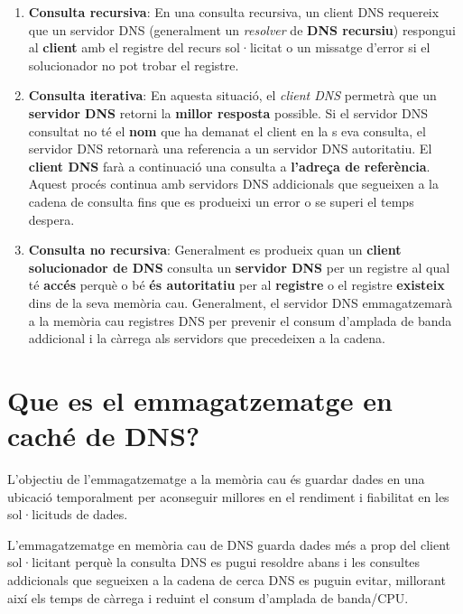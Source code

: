 \documentclass[]{article}
\begin{document}
\begin{enumerate}
\def\labelenumi{\arabic{enumi}.}
\item
  \textbf{Consulta recursiva}: En una consulta recursiva, un client DNS
  requereix que un servidor DNS (generalment un \emph{resolver} de
  \textbf{DNS recursiu}) respongui al \textbf{client} amb el registre
  del recurs sol·licitat o un missatge d'error si el solucionador no pot
  trobar el registre.
\item
  \textbf{Consulta iterativa}: En aquesta situació, el \emph{client DNS}
  permetrà que un \textbf{servidor DNS} retorni la \textbf{millor
  resposta} possible. Si el servidor DNS consultat no té el \textbf{nom}
  que ha demanat el client en la s eva consulta, el servidor DNS
  retornarà una referencia a un servidor DNS autoritatiu. El
  \textbf{client DNS} farà a continuació una consulta a \textbf{l'adreça
  de referència}. Aquest procés continua amb servidors DNS addicionals
  que segueixen a la cadena de consulta fins que es produeixi un error o
  se superi el temps despera.
\item
  \textbf{Consulta no recursiva}: Generalment es produeix quan un
  \textbf{client solucionador de DNS} consulta un \textbf{servidor DNS}
  per un registre al qual té \textbf{accés} perquè o bé \textbf{és
  autoritatiu} per al \textbf{registre} o el registre \textbf{existeix}
  dins de la seva memòria cau. Generalment, el servidor DNS
  emmagatzemarà a la memòria cau registres DNS per prevenir el consum
  d'amplada de banda addicional i la càrrega als servidors que
  precedeixen a la cadena.
\end{enumerate}

\hypertarget{que-es-el-emmagatzematge-en-cachuxe9-de-dns}{%
\section{\texorpdfstring{\textbf{Que es el emmagatzematge en caché de
DNS?}}{Que es el emmagatzematge en caché de DNS?}}\label{que-es-el-emmagatzematge-en-cachuxe9-de-dns}}

L'objectiu de l'emmagatzematge a la memòria cau és guardar dades en una
ubicació temporalment per aconseguir millores en el rendiment i
fiabilitat en les sol·licituds de dades.

L'emmagatzematge en memòria cau de DNS guarda dades més a prop del
client sol·licitant perquè la consulta DNS es pugui resoldre abans i les
consultes addicionals que segueixen a la cadena de cerca DNS es puguin
evitar, millorant així els temps de càrrega i reduint el consum
d'amplada de banda/CPU.
\end{document}
